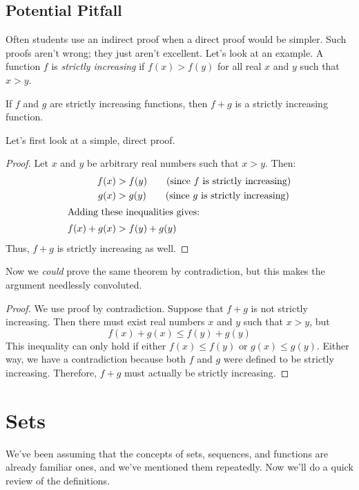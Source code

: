 \begin{editingnotes}

\subsection{Potential Pitfall}

Often students use an indirect proof when a direct proof would be
simpler.  Such proofs aren't wrong; they just aren't excellent.  Let's
look at an example.  A function $f$ is \textit{strictly increasing} if
$f(x) > f(y)$ for all real $x$ and $y$ such that $x > y$.

\begin{theorem}
If $f$ and $g$ are strictly increasing functions, then $f + g$ is a
strictly increasing function.
\end{theorem}

Let's first look at a simple, direct proof.

\begin{proof}
Let $x$ and $y$ be arbitrary real numbers such that $x > y$.  Then:
%
\begin{align*}
f(x) & > f(y) \qquad \text{(since $f$ is strictly increasing)} \\
g(x) & > g(y) \qquad \text{(since $g$ is strictly increasing)} \\
\intertext{Adding these inequalities gives:}
f(x) + g(x) & > f(y) + g(y)
\end{align*}
%
Thus, $f + g$ is strictly increasing as well.
\end{proof}

Now we \textit{could} prove the same theorem by contradiction, but
this makes the argument needlessly convoluted.

\begin{proof}
We use proof by contradiction.  Suppose that $f + g$ is not strictly
increasing.  Then there must exist real numbers $x$ and $y$ such that
$x > y$, but
%
\[
f(x) + g(x) \leq f(y) + g(y)
\]
%
This inequality can only hold if either $f(x) \leq f(y)$ or $g(x) \leq
g(y)$.  Either way, we have a contradiction because both $f$ and $g$
were defined to be strictly increasing.  Therefore, $f + g$ must
actually be strictly increasing.
\end{proof}

\end{editingnotes}

\section{Sets}
\begin{editingnotes}
We've been assuming that the concepts of sets, sequences, and functions are
already familiar ones, and we've mentioned them repeatedly.  Now we'll do a
quick review of the definitions.
\end{editingnotes}

